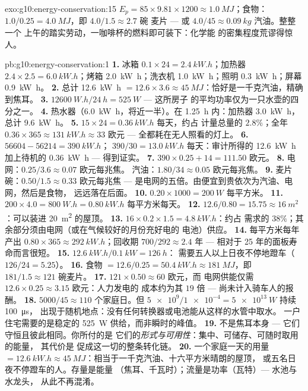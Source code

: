 \begin{solution}{exo:g10:energy-conservation:15}
$E_p = 85 \times 9.81 \times 1200 \approx \qty{1.0}{MJ}$；食物：
$1.0/0.25 = \qty{4.0}{MJ}$，即 $4.0/1.5 \approx 2.7$ 碗
麦片 --- 或 $4.0/45 \approx \qty{0.09}{kg}$ 汽油。整整一个
上午的踏实劳动，一咖啡杯的燃料即可装下：化学能
的密集程度荒谬得惊人。
\end{solution}

\begin{solution}{pb:g10:energy-conservation:1}
\textbf{1.} 冰箱 $0.1 \times 24 = \qty{2.4}{kW.h}$；加热器
$2.4 \times 2.5 = \qty{6.0}{kW.h}$；烤箱 \qty{2.0}{kW.h}；洗衣机
\qty{1.0}{kW.h}；照明 \qty{0.3}{kW.h}；屏幕
\qty{0.9}{kW.h}。
\textbf{2.} 总计 \qty{12.6}{kW.h} $= 12.6 \times 3.6 \approx
\qty{45}{MJ}$：恰好是一千克汽油，精确到焦耳。
\textbf{3.} $\qty{12600}{W.h}/\qty{24}{h} = \qty{525}{W}$ --- 这所房子
的平均功率仅为一只水壶的四分之一。
\textbf{4.} 热水器（\qty{6.0}{kW.h}，将近一半）。在
\qty{1.25}{h} 内：加热器 \qty{3.0}{kW.h}，总计 \qty{9.6}{kW.h}。
\textbf{5.} $15 \times 24 = \qty{0.36}{kW.h}$ 每天，约占
计量总量的 $2.8\%$；全年 $0.36 \times 365 \approx
\qty{131}{kW.h} \approx 33$ 欧元 --- 全都耗在无人照看的灯上。
\textbf{6.} $56604 - 56214 = \qty{390}{kW.h}$；
$390/30 = \qty{13.0}{kW.h}$ 每天：审计所得的 \qty{12.6}{kW.h}
加上待机的 \qty{0.36}{kW.h} --- 得到证实。
\textbf{7.} $390 \times 0.25 + 14 = 111.50$ 欧元。
\textbf{8.} 电网：$0.25/3.6 \approx 0.07$ 欧元每兆焦。
汽油：$1.80/34 \approx 0.05$ 欧元每兆焦。
\textbf{9.} 麦片碗：$0.50/1.5 \approx 0.33$ 欧元每兆焦 ---
是电网的五倍。由便宜到贵依次为汽油、电网，然后是食物，
远远落在后面。
\textbf{10.} $0.20 \times 1000 = \qty{200}{W}$ 每平方米。
\textbf{11.} $200 \times 4.0 = \qty{800}{W.h} = \qty{0.80}{kW.h}$
每平方米每天。
\textbf{12.} $12.6/0.80 = 15.75 \approx \qty{16}{m^2}$：可以装进
\qty{20}{m^2} 的屋顶。
\textbf{13.} $16 \times 0.2 \times 1.5 = \qty{4.8}{kW.h}$：约占
需求的 $38\%$；其余部分须由电网（或在气候较好的月份充好电的
电池）供应。
\textbf{14.} 每平方米每年产出 $0.80 \times 365 \approx
\qty{292}{kW.h}$；回收期 $700/292 \approx 2.4$ 年 ---
相对于 25 年的面板寿命而言很短。
\textbf{15.} $\qty{12.6}{kW.h}/\qty{0.1}{kW} = \qty{126}{h}$：
需要五人以上日夜不停地蹬车（$126/24 = 5.25$）。
\textbf{16.} 食物 $= 12.6/0.25 = \qty{50.4}{kW.h} \approx
\qty{181}{MJ}$，即 $181/1.5 \approx 121$ 碗麦片。
\textbf{17.} $121 \times 0.50 \approx 60$ 欧元，而
电网供能仅需 $12.6 \times 0.25 \approx 3.15$ 欧元：人力发电的
成本约为其 $19$ 倍 --- 尚未计入骑车人的报酬。
\textbf{18.} $5000/45 \approx 110$ 个家庭日。但
$\num{5e9}/\num{1e-4} = \qty{5e13}{W}$ 持续 \qty{100}{\micro s}，
出现于随机地点：没有任何转换器或电池能从这样的水管中取水。
一户住宅需要的是稳定的 \qty{525}{W} 供给，而非瞬时的峰值。
\textbf{19.} 不是焦耳本身 --- 它们守恒且彼此相同。你所付的是
它们的\emph{形式与可用性}：集中、可储存、可随时取用的能量，
其代价是
促成这一切的整条转化链。
\textbf{20.} 一个家庭一天的用量 $= \qty{12.6}{kW.h} \approx
\qty{45}{MJ}$：相当于一千克汽油、十六平方米晴朗的屋顶，
或五名日夜不停蹬车的人。存量是能量
（焦耳、千瓦时）；流量是功率（瓦特）--- 水池与水龙头，
从此不再混淆。
\end{solution}
